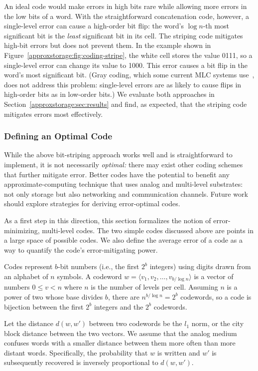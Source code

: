 An ideal code would make errors in high bits rare while allowing more errors
in the low bits of a word. With the straightforward concatenation code, however,
a single-level error can cause a high-order bit flip: the word's $\log n$-th
most significant bit is the \emph{least} significant bit in its cell.
The striping code mitigates high-bit errors but does not prevent them. In the
example shown in Figure~\ref{approxstorage:fig:coding-stripe}, the white cell stores the
value 0111, so a single-level error can change its value to 1000. This error
causes a bit flip in the word's most significant bit.
(Gray coding, which some current MLC systems use~\cite{improvingwrites}, does
not address this problem: single-level errors are as likely to cause flips in
high-order bits as in low-order bits.)
We evaluate both approaches in
Section~\ref{approxstorage:sec:results} and find, as expected, that the striping code
mitigates errors most effectively.


\subsubsection{Defining an Optimal Code}

While the above bit-striping approach works well and is straightforward to
implement, it is not necessarily \emph{optimal:} there may exist other
coding schemes that further mitigate error.
Better codes have the potential to benefit any approximate-computing
technique that uses analog and multi-level substrates: not only storage but
also networking and communication channels.
Future work should explore strategies for deriving error-optimal codes.

As a first step in this direction, this section formalizes the notion of
error-minimizing, multi-level codes.
The two simple codes discussed above are points in a large space of possible
codes.
We also define the average error of a code as a way to quantify the code's error-mitigating
power.


Codes represent $b$-bit numbers (i.e., the first $2^b$ integers) using digits drawn from an alphabet of $n$ symbols. A codeword $w = \langle v_1,
v_2, \dots, v_{b/\log n} \rangle$ is a vector of numbers $0 \le v < n$
where $n$ is the number of levels per cell. Assuming $n$ is a power of
two whose base divides $b$, there are $n ^ {b / \log n} = 2 ^ b$
codewords, so a code is bijection between the first $2^b$ integers and
the $2^b$ codewords.

Let the distance $d(w, w')$ between two codewords be the $l_1$ norm,
or the city block distance between the two vectors. We assume that the analog
medium confuses words with a smaller distance between them more often than
more distant words. Specifically, the probability that $w$ is written and $w'$ is subsequently recovered is inversely proportional to $d(w, w')$.

